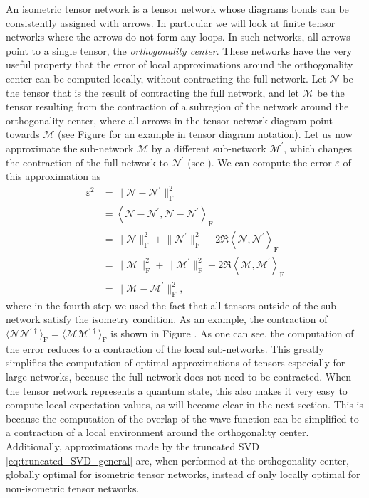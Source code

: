 An isometric tensor network is a tensor network whose diagrams bonds can be consistently assigned with arrows. In particular we will look at finite tensor networks where the arrows do not form any loops. In such networks, all arrows point to a single tensor, the \textit{orthogonality center}. These networks have the very useful property that the error of local approximations around the orthogonality center can be computed locally, without contracting the full network. Let $\mathcal{N}$ be the tensor that is the result of contracting the full network, and let $\mathcal{M}$ be the tensor resulting from the contraction of a subregion of the network around the orthogonality center, where all arrows in the tensor network diagram point towards $\mathcal{M}$ (see Figure  for an example in tensor diagram notation). Let us now approximate the sub-network $\mathcal{M}$ by a different sub-network $\mathcal{M}^\prime$, which changes the contraction of the full network to $\mathcal{N}^\prime$ (see ). We can compute the error $\varepsilon$ of this approximation as
\begin{equation}
\begin{split}
	\varepsilon^2 &= \lVert\mathcal{N}-\mathcal{N}^\prime\rVert^2_\text{F} \\
	&=
	\left\langle\mathcal{N}-\mathcal{N}^\prime, \mathcal{N}-\mathcal{N}^\prime\right\rangle_\text{F} \\
	&= \lVert\mathcal{N}\rVert_\text{F}^2 + \lVert\mathcal{N}^\prime\rVert_\text{F}^2 - 2\Re\left\langle\mathcal{N},\mathcal{N}^\prime\right\rangle_\text{F} \\
	&= \lVert\mathcal{M}\rVert_\text{F}^2 + \lVert\mathcal{M}^\prime\rVert_\text{F}^2 - 2\Re\left\langle\mathcal{M},\mathcal{M}^\prime\right\rangle_\text{F} \\
	&= \lVert\mathcal{M}-\mathcal{M}^\prime\rVert^2_\text{F},
\end{split}
\end{equation}
where in the fourth step we used the fact that all tensors outside of the sub-network satisfy the isometry condition. As an example, the contraction of $\langle\mathcal{N}\mathcal{N}^{\prime\dagger}\rangle_\text{F} = \langle\mathcal{M}\mathcal{M}^{\prime\dagger}\rangle_\text{F}$ is shown in Figure . As one can see, the computation of the error reduces to a contraction of the local sub-networks. This greatly simplifies the computation of optimal approximations of tensors especially for large networks, because the full network does not need to be contracted. When the tensor network represents a quantum state, this also makes it very easy to compute local expectation values, as will become clear in the next section. This is because the computation of the overlap of the wave function can be simplified to a contraction of a local environment around the orthogonality center. Additionally, approximations made by the truncated SVD \ref{eq:truncated_SVD_general} are, when performed at the orthogonality center, globally optimal for isometric tensor networks, instead of only locally optimal for non-isometric tensor networks.
